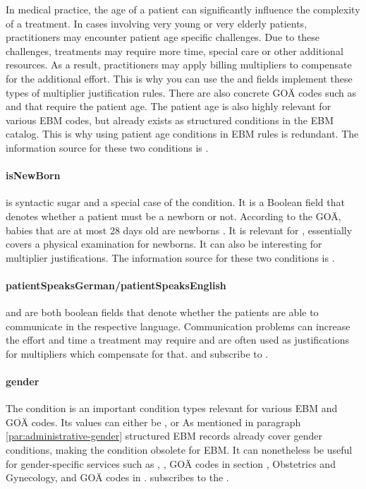 In medical practice, the age of a patient can significantly influence the complexity of a treatment.
In cases involving very young or very elderly patients, practitioners may encounter patient age specific challenges.
Due to these challenges, treatments may require more time, special care or other additional resources.
As a result, practitioners may apply billing multipliers to compensate for the additional effort.
This is why you can use the \minPatientAge and \maxPatientAge fields implement these types of multiplier justification rules.
There are also concrete GOÄ codes such as  and  that require the patient age.
The patient age is also highly relevant for various EBM codes, but already exists as structured conditions in the EBM catalog.
This is why using patient age conditions in EBM rules is redundant.
The information source for these two conditions is .

\paragraph{isNewBorn}
\isNewBorn is syntactic sugar and a special case of the \maxPatientAge condition.
It is a Boolean field that denotes whether a patient must be a newborn or not.
According to the GOÄ, babies that are at most 28 days old are newborns \cite{bruck1998kommentar}.
It is relevant for , essentially covers a physical examination for newborns.
It can also be interesting for multiplier justifications.
The information source for these two conditions is .

\paragraph{patientSpeaksGerman/patientSpeaksEnglish}
\patientSpeaksGerman and \patientSpeaksEnglish are both boolean fields that denote whether the patients are able to communicate in the respective language.
Communication problems can increase the effort and time a treatment may require and are often used as justifications for multipliers which compensate for that.
\patientSpeaksGerman and \patientSpeaksEnglish subscribe to .

\paragraph{gender}
The \gender condition is an important condition types relevant for various EBM and GOÄ codes.
Its values can either be ,  or 
As mentioned in paragraph \ref{par:administrative-gender} structured EBM records already cover gender conditions, making the \gender condition obsolete for EBM.
It can nonetheless be useful for gender-specific services such as  , ,  GOÄ codes in section , Obstetrics and Gynecology, and GOÄ codes in .
\gender subscribes to the .


